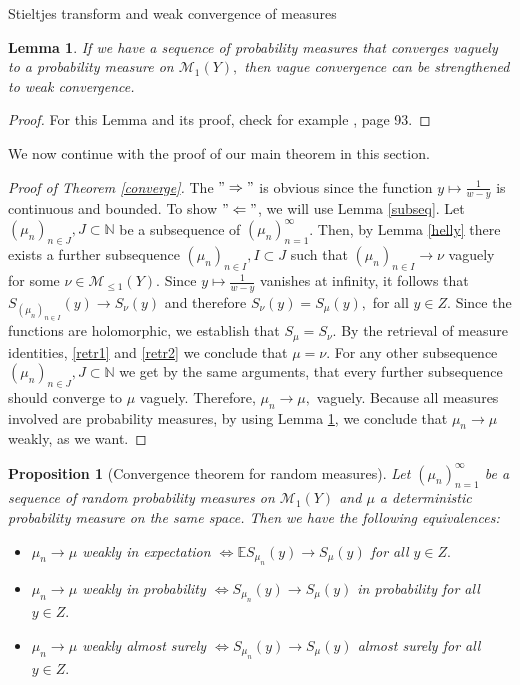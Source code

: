 \documentclass[11pt, a4paper, oneside]{book}
\numberwithin{equation}{chapter}
\newtheorem{prop}[thm]{Proposition}
\newtheorem{lem}[thm]{Lemma}
\begin{document}
\begin{section}{Stieltjes transform and weak convergence of measures}
\begin{lem} \label{vague-weak} If we have a sequence of probability measures that converges vaguely to a probability measure on $\mathcal{M}_1(Y),$ then vague convergence can be strengthened to weak convergence.
\end{lem}

\begin{proof}
For this Lemma and its proof, check for example \cite{chung2001course}, page 93.
\end{proof}

We now continue with the proof of our main theorem in this section.

\begin{proof}[Proof of Theorem \ref{converge}] The $"\Rightarrow"$ is obvious since the function $y \mapsto \frac{1}{w-y}$ is continuous and bounded. To show $"\Leftarrow"$, we will use Lemma \ref{subseq}. Let $(\mu_n)_{n \in J}, J \subset \mathbb{N}$  be a subsequence of $(\mu_n)_{n=1}^\infty$. Then, by Lemma \ref{helly} there exists a further subsequence $(\mu_n)_{n \in I}, I \subset J$ such that $(\mu_{n})_{n \in I} \to \nu$ vaguely for some $\nu \in \mathcal{M}_{\leq 1}(Y).$ Since $y \mapsto \frac{1}{w-y}$ vanishes at infinity, it follows that $S_{(\mu_n)_{n \in I}}(y) \to S_{\nu}(y)$ and therefore $S_{\nu}(y) = S_{\mu}(y),$ for all $y \in Z.$ Since the functions are holomorphic, we establish that $S_\mu = S_{\nu}.$ By the retrieval of measure identities, \eqref{retr1} and \eqref{retr2} we conclude that $\mu = \nu$. For any other subsequence $(\mu_n)_{n \in J}, J \subset \mathbb{N}$ we get by the same arguments, that every further subsequence should converge to $\mu$ vaguely. Therefore, $\mu_n \to \mu,$ vaguely. Because all measures involved are probability measures, by using Lemma \ref{vague-weak}, we conclude that $\mu_n \to \mu$ weakly, as we want.
\end{proof}

\begin{prop}[Convergence theorem for random measures] Let $(\mu_n)_{n=1}^\infty$ be a sequence of random probability measures on $\mathcal{M}_1(Y)$ and $\mu$ a deterministic probability measure on the same space. Then we have the following equivalences:
\begin{itemize}
    \item $\mu_n \to \mu$ \textit{weakly in expectation} $\Leftrightarrow \mathbb{E}S_{\mu_n}(y) \to S_{\mu}(y)$ \textit{for all} $y \in Z .$
    \item $\mu_n \to \mu$ \textit{weakly in probability} $\Leftrightarrow S_{\mu_n}(y) \to S_\mu(y)$  \textit{in probability for all} $y \in Z .$
    \item $\mu_n \to \mu$ \textit{weakly almost surely} $\Leftrightarrow S_{\mu_n}(y) \to S_{\mu}(y)$ \textit{almost surely for all} $y \in Z.$
\end{itemize}
\end{prop}


\end{section}
\end{document}
